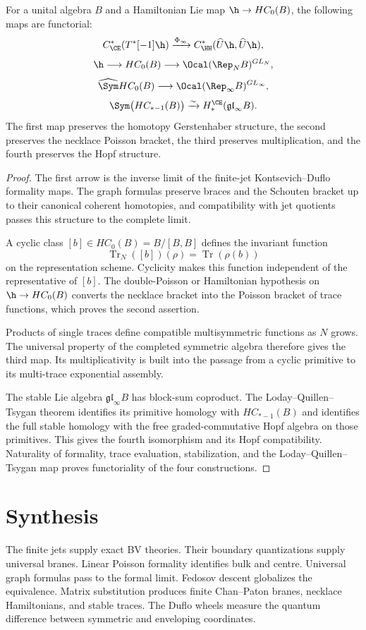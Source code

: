 \begin{theorem}
For a unital algebra $B$ and a Hamiltonian Lie map $\h\to HC_0(B)$, the following maps are functorial:
\[
 C^*_{\CE}(T^*[-1]\h)
 \xrightarrow{\Phi_\infty}
 C^*_{\HH}(\widehat U\h,\widehat U\h),
\]
\[
 \h\longrightarrow HC_0(B)
 \longrightarrow\Ocal(\Rep_NB)^{GL_N},
\]
\[
 \widehat\Sym HC_0(B)
 \longrightarrow\Ocal(\Rep_\infty B)^{GL_\infty},
\]
\[
 \Sym\bigl(HC_{*-1}(B)\bigr)
 \xrightarrow{\sim}
 H_*^{\CE}(\mathfrak{gl}_\infty B).
\]
The first map preserves the homotopy Gerstenhaber structure, the second preserves the necklace Poisson bracket, the third preserves multiplication, and the fourth preserves the Hopf structure.
\end{theorem}
\begin{proof}
The first arrow is the inverse limit of the finite-jet Kontsevich--Duflo formality maps.  The graph formulas preserve braces and the Schouten bracket up to their canonical coherent homotopies, and compatibility with jet quotients passes this structure to the complete limit.

A cyclic class $[b]\in HC_0(B)=B/[B,B]$ defines the invariant function
\[
 \operatorname{Tr}_N([b])(\rho)=\operatorname{Tr}(\rho(b))
\]
on the representation scheme.  Cyclicity makes this function independent of the representative of $[b]$.  The double-Poisson or Hamiltonian hypothesis on $\h\to HC_0(B)$ converts the necklace bracket into the Poisson bracket of trace functions, which proves the second assertion.

Products of single traces define compatible multisymmetric functions as $N$ grows.  The universal property of the completed symmetric algebra therefore gives the third map.  Its multiplicativity is built into the passage from a cyclic primitive to its multi-trace exponential assembly.

The stable Lie algebra $\mathfrak{gl}_\infty B$ has block-sum coproduct.  The Loday--Quillen--Tsygan theorem identifies its primitive homology with $HC_{*-1}(B)$ and identifies the full stable homology with the free graded-commutative Hopf algebra on those primitives.  This gives the fourth isomorphism and its Hopf compatibility.  Naturality of formality, trace evaluation, stabilization, and the Loday--Quillen--Tsygan map proves functoriality of the four constructions.
\end{proof}

\chapter{Synthesis}
The finite jets supply exact BV theories.  Their boundary quantizations supply universal branes.  Linear Poisson formality identifies bulk and centre.  Universal graph formulas pass to the formal limit.  Fedosov descent globalizes the equivalence.  Matrix substitution produces finite Chan--Paton branes, necklace Hamiltonians, and stable traces.  The Duflo wheels measure the quantum difference between symmetric and enveloping coordinates.

